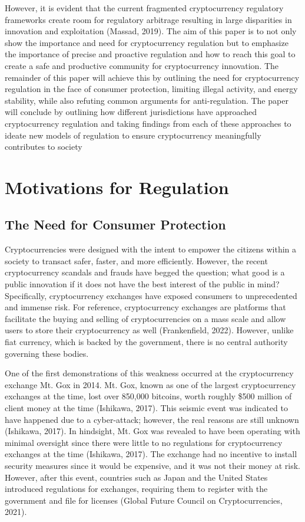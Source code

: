 \documentclass{article}
\begin{document}
\noindent \newline However, it is evident that the current fragmented cryptocurrency regulatory frameworks create room for regulatory arbitrage resulting in large disparities in innovation and exploitation (Massad, 2019). The aim of this paper is to not only show the importance and need for cryptocurrency regulation but to emphasize the importance of precise and proactive regulation and how to reach this goal to create a safe and productive community for cryptocurrency innovation. The remainder of this paper will achieve this by outlining the need for cryptocurrency regulation in the face of consumer protection, limiting illegal activity, and energy stability, while also refuting common arguments for anti-regulation. The paper will conclude by outlining how different jurisdictions have approached cryptocurrency regulation and taking findings from each of these approaches to ideate new models of regulation to ensure cryptocurrency meaningfully contributes to society



\section{Motivations for Regulation}
\subsection {The Need for Consumer Protection}

\noindent Cryptocurrencies were designed with the intent to empower the citizens within a society to transact safer, faster, and more efficiently. However, the recent cryptocurrency scandals and frauds have begged the question; what good is a public innovation if it does not have the best interest of the public in mind? Specifically, cryptocurrency exchanges have exposed consumers to unprecedented and immense risk. For reference, cryptocurrency exchanges are platforms that facilitate the buying and selling of cryptocurrencies on a mass scale and allow users to store their cryptocurrency as well (Frankenfield, 2022). However, unlike fiat currency, which is backed by the government, there is no central authority governing these bodies. 

\noindent \newline One of the first demonstrations of this weakness occurred at the cryptocurrency exchange Mt. Gox in 2014. Mt. Gox, known as one of the largest cryptocurrency exchanges at the time, lost over 850,000 bitcoins, worth roughly \$500 million of client money at the time (Ishikawa, 2017). This seismic event was indicated to have happened due to a cyber-attack; however, the real reasons are still unknown (Ishikawa, 2017). In hindsight, Mt. Gox was revealed to have been operating with minimal oversight since there were little to no regulations for cryptocurrency exchanges at the time (Ishikawa, 2017). The exchange had no incentive to install security measures since it would be expensive, and it was not their money at risk. However, after this event, countries such as Japan and the United States introduced regulations for exchanges, requiring them to register with the government and file for licenses (Global Future Council on Cryptocurrencies, 2021).
\end{document}
